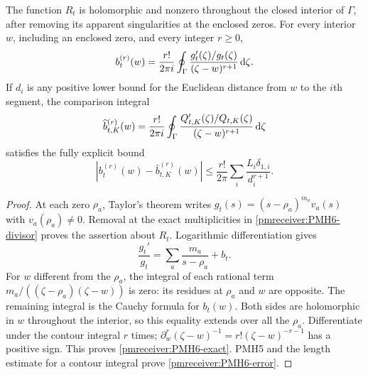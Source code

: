 \begin{pmreceivertheorem}
\label{pmreceiver:PMH6}
The function $R_t$ is holomorphic and nonzero throughout the closed
interior of $\Gamma$, after removing its apparent singularities at
the enclosed zeros. For every interior $w$, including an enclosed
zero, and every integer $r\ge0$,
\begin{equation}\label{pmreceiver:PMH6-exact}
 b_t^{(r)}(w)=\frac{r!}{2\pi i}\oint_\Gamma
       \frac{g_t'(\zeta)/g_t(\zeta)}{(\zeta-w)^{r+1}}\,\mathrm d\zeta.
\end{equation}
If $d_i$ is any positive lower bound for the Euclidean distance
from $w$ to the $i$th segment, the comparison integral
\begin{equation}\label{pmreceiver:PMH6-approx}
 \widehat b_{t,K}^{(r)}(w)=\frac{r!}{2\pi i}\oint_\Gamma
       \frac{Q_{t,K}'(\zeta)/Q_{t,K}(\zeta)}{(\zeta-w)^{r+1}}\,\mathrm d\zeta
\end{equation}
satisfies the fully explicit bound
\begin{equation}\label{pmreceiver:PMH6-error}
 |b_t^{(r)}(w)-\widehat b_{t,K}^{(r)}(w)|
 \le\frac{r!}{2\pi}\sum_i\frac{L_i\delta_{1,i}}{d_i^{r+1}}.
\end{equation}
\end{pmreceivertheorem}
\begin{proof}
At each zero $\rho_a$, Taylor's theorem writes
$g_t(s)=(s-\rho_a)^{m_a}v_a(s)$ with $v_a(\rho_a)\ne0$.
Removal at the exact multiplicities in \eqref{pmreceiver:PMH6-divisor} proves
the assertion about $R_t$. Logarithmic differentiation gives
\[
 \frac{g_t'}{g_t}=\sum_a\frac{m_a}{s-\rho_a}+b_t.
\]
For $w$ different from the $\rho_a$, the integral of each rational
term $m_a/((\zeta-\rho_a)(\zeta-w))$ is zero: its residues at
$\rho_a$ and $w$ are opposite. The remaining integral is the
Cauchy formula for $b_t(w)$. Both sides are holomorphic in $w$
throughout the interior, so this equality extends over all the
$\rho_a$. Differentiate under the contour integral $r$ times;
$\partial_w^r(\zeta-w)^{-1}=r!(\zeta-w)^{-r-1}$ has a positive
sign. This proves \eqref{pmreceiver:PMH6-exact}. PMH5 and the length estimate
for a contour integral prove \eqref{pmreceiver:PMH6-error}.
\end{proof}

